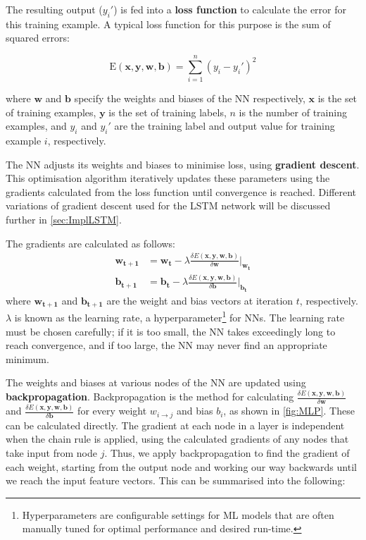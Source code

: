 \documentclass[12pt,a4paper,twoside,openright]{report}
\renewcommand{\vec}[1]{\mathbf{#1}}
\begin{document}

The resulting output ($y_i'$) is fed into a \textbf{loss function} to calculate the error for this
training example. A typical loss function for this purpose is the sum of squared errors:

\begin{equation}
\text{E}(\vec{x}, \vec{y}, \vec{w}, \vec{b})  = \sum_{i=1}^{n} (y_i - y_i')^2
\end{equation}

where $\vec{w}$ and $\vec{b}$ specify the weights and biases of the NN respectively, 
$\vec{x}$ is the set of training examples,
$\vec{y}$ is the set of training labels, $n$ is the number of training examples, and $y_i$ and $y_i'$
are the training label and output value for training example $i$, respectively.

The NN adjusts its weights and biases to minimise
loss, using \textbf{gradient descent}. This optimisation algorithm
iteratively updates these parameters using the gradients calculated from the loss function until
convergence is reached. Different variations of gradient descent used for the LSTM network
will be discussed further in \cref{sec:ImplLSTM}.

The gradients are calculated as follows:
\begin{align}
\vec{w_{t+1}} &= \vec{w_t} - \lambda \frac{\delta E(\vec{x}, \vec{y}, \vec{w}, \vec{b})}{\delta \vec{w}} \Big|_\vec{w_t}\\
\vec{b_{t+1}} &= \vec{b_t} - \lambda \frac{\delta E(\vec{x}, \vec{y}, \vec{w}, \vec{b})}{\delta \vec{b}} \Big|_\vec{b_t}
\end{align}
where $\vec{w_{t+1}}$ and $\vec{b_{t+1}}$ are the weight and bias vectors at iteration $t$, respectively.
$\lambda$ is known as the learning rate, a hyperparameter\footnote{Hyperparameters are configurable
settings for ML models that are often manually tuned for optimal performance and desired run-time.} for NNs.
The learning rate must be chosen carefully; if it is too small, the NN takes exceedingly long to reach
convergence, and if too large, the NN may never find an appropriate minimum.


The weights and biases at various nodes of the NN are updated using \textbf{backpropagation}. Backpropagation
is the method for calculating $\frac{\delta E(\vec{x}, \vec{y}, \vec{w}, \vec{b})}{\delta \vec{w}}$ and
$\frac{\delta E(\vec{x}, \vec{y}, \vec{w}, \vec{b})}{\delta \vec{b}}$ for every weight $w_{i \rightarrow j}$ and bias
$b_{i}$, as shown in \cref{fig:MLP}. These can be calculated directly. The gradient at each node in a layer is
independent when the chain rule is applied, using the calculated gradients of any nodes that take input from
node $j$. Thus, we apply backpropagation to find the gradient of each weight, starting from the output node and
working our way backwards until we reach the input feature vectors. This can be summarised into the following:
\end{document}
